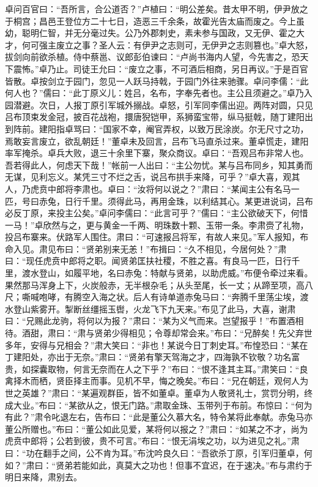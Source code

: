 卓问百官曰：“吾所言，合公道否？”卢植曰：“明公差矣。昔太甲不明，伊尹放之于桐宫；昌邑王登位方二十七日，造恶三千余条，故霍光告太庙而废之。今上虽幼，聪明仁智，并无分毫过失。公乃外郡刺史，素未参与国政，又无伊、霍之大才，何可强主废立之事？圣人云：有伊尹之志则可，无伊尹之志则篡也。”卓大怒，拔剑向前欲杀植。侍中蔡邕、议郎彭伯谏曰：“卢尚书海内人望，今先害之，恐天下震怖。”卓乃止。司徒王允曰：“废立之事，不可酒后相商，另日再议。”于是百官皆散。卓按剑立于园门，忽见一人跃马持戟，于园门外往来驰骤。卓问李儒：“此何人也？”儒曰：“此丁原义儿：姓吕，名布，字奉先者也。主公且须避之。”卓乃入园潜避。次日，人报丁原引军城外搦战。卓怒，引军同李儒出迎。两阵对圆，只见吕布顶束发金冠，披百花战袍，擐唐猊铠甲，系狮蛮宝带，纵马挺戟，随丁建阳出到阵前。建阳指卓骂曰：“国家不幸，阉官弄权，以致万民涂炭。尔无尺寸之功，焉敢妄言废立，欲乱朝廷！”董卓未及回言，吕布飞马直杀过来。董卓慌走，建阳率军掩杀。卓兵大败，退三十余里下寨，聚众商议。卓曰：“吾观吕布非常人也。吾若得此人，何虑天下哉！”帐前一人出曰：“主公勿忧。某与吕布同乡，知其勇而无谋，见利忘义。某凭三寸不烂之舌，说吕布拱手来降，可乎？”卓大喜，观其人，乃虎贲中郎将李肃也。卓曰：“汝将何以说之？”肃曰：“某闻主公有名马一匹，号曰赤兔，日行千里。须得此马，再用金珠，以利结其心。某更进说词，吕布必反丁原，来投主公矣。”卓问李儒曰：“此言可乎？”儒曰：“主公欲破天下，何惜一马！”卓欣然与之，更与黄金一千两、明珠数十颗、玉带一条。李肃赍了礼物，投吕布寨来。伏路军人围住。肃曰：“可速报吕将军，有故人来见。”军人报知，布命入见。肃见布曰：“贤弟别来无恙！”布揖曰：“久不相见，今居何处？”肃曰：“现任虎贲中郎将之职。闻贤弟匡扶社稷，不胜之喜。有良马一匹，日行千里，渡水登山，如履平地，名曰赤兔：特献与贤弟，以助虎威。”布便令牵过来看。果然那马浑身上下，火炭般赤，无半根杂毛；从头至尾，长一丈；从蹄至项，高八尺；嘶喊咆哮，有腾空入海之状。后人有诗单道赤兔马曰：“奔腾千里荡尘埃，渡水登山紫雾开。掣断丝缰摇玉辔，火龙飞下九天来。”布见了此马，大喜，谢肃曰：“兄赐此龙驹，将何以为报？”肃曰：“某为义气而来。岂望报乎！”布置酒相待。酒甜，肃曰：“肃与贤弟少得相见；令尊却常会来。”布曰：“兄醉矣！先父弃世多年，安得与兄相会？”肃大笑曰：“非也！某说今日丁刺史耳。”布惶恐曰：“某在丁建阳处，亦出于无奈。”肃曰：“贤弟有擎天驾海之才，四海孰不钦敬？功名富贵，如探囊取物，何言无奈而在人之下乎？”布曰：“恨不逢其主耳。”肃笑曰：“良禽择木而栖，贤臣择主而事。见机不早，悔之晚矣。”布曰：“兄在朝廷，观何人为世之英雄？”肃曰：“某遍观群臣，皆不如董卓。董卓为人敬贤礼士，赏罚分明，终成大业。”布曰：“某欲从之，恨无门路。”肃取金珠、玉带列于布前。布惊曰：“何为有此？”肃令叱退左右，告布曰：“此是董公久慕大名，特令某将此奉献。赤兔马亦董公所赠也。”布曰：“董公如此见爱，某将何以报之？”肃曰：“如某之不才，尚为虎贲中郎将；公若到彼，贵不可言。”布曰：“恨无涓埃之功，以为进见之礼。”肃曰：“功在翻手之间，公不肯为耳。”布沈吟良久曰：“吾欲杀丁原，引军归董卓，何如？”肃曰：“贤弟若能如此，真莫大之功也！但事不宜迟，在于速决。”布与肃约于明日来降，肃别去。

